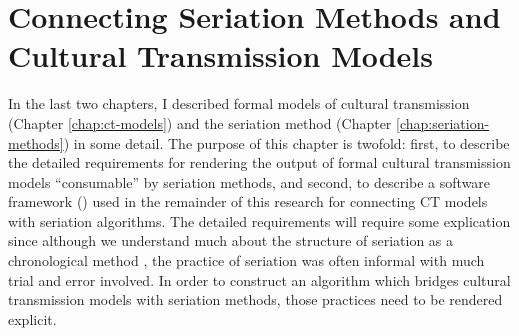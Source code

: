 \begin{description}[leftmargin=-1\labelwidth]
\item[\textsc{Overview}] \lipsum[1]
\item[\textsc{Contents}] \lipsum[2]
\end{description}



\section{Connecting Seriation Methods and Cultural Transmission Models}

In the last two chapters, I described formal models of cultural transmission (Chapter \ref{chap:ct-models}) and the seriation method (Chapter \ref{chap:seriation-methods}) in some detail.  The purpose of this chapter is twofold:  first, to describe the detailed requirements for rendering the output of formal cultural transmission models ``consumable'' by seriation methods, and second, to describe a software framework (\seriationct) used in the remainder of this research for connecting CT models with seriation algorithms.  The detailed requirements will require some explication since although we understand much about the structure of seriation as a chronological method \citep{Dunnell1970,Rouse1967}, the practice of seriation was often informal with much trial and error involved.  In order to construct an algorithm which bridges cultural transmission models with seriation methods, those practices need to be rendered explicit.  

